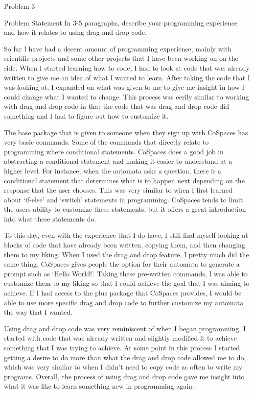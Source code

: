 \begin{problem}{Problem 3}
    \begin{statement}{Problem Statement}
        In 3-5 paragraphs, describe your programming experience and how it relates to using drag and drop code.
    \end{statement}

    \begin{Highlight}[Response]
        So far I have had a decent amount of programming experience, mainly with scientific projects and some other projects that I have been working on on the side. When I started learning how to code, I had to
        look at code that was already written to give me an idea of what I wanted to learn. After taking the code that I was looking at, I expanded on what was given to me to give me insight in how I could change
        what I wanted to change. This process was eerily similar to working with drag and drop code in that the code that was drag and drop code did something and I had to figure out how to customize it.

        The base package that is given to someone when they sign up with CoSpaces has very basic commands. Some of the commands that directly relate to programming where conditional statements. CoSpaces does a good
        job in abstracting a conditional statement and making it easier to understand at a higher level. For instance, when the automata asks a question, there is a conditional statement that determines what is to 
        happen next depending on the response that the user chooses. This was very similar to when I first learned about `if-else' and `switch' statements in programming. CoSpaces tends to limit the users ability to
        customize these statements, but it offers a great introduction into what these statements do.

        To this day, even with the experience that I do have, I still find myself looking at blocks of code that have already been written, copying them, and then changing them to my liking. When I used the drag and
        drop feature, I pretty much did the same thing. CoSpaces gives people the option for their automata to generate a prompt such as `Hello World!'. Taking these pre-written commands, I was able to customize them
        to my liking so that I could achieve the goal that I was aiming to achieve. If I had access to the plus package that CoSpaces provides, I would be able to use more specific drag and drop code to further customize
        my automata the way that I wanted.

        Using drag and drop code was very reminiscent of when I began programming. I started with code that was already written and slightly modified it to achieve something that I was trying to achieve. At some point
        in this process I started getting a desire to do more than what the drag and drop code allowed me to do, which was very similar to when I didn't need to copy code as often to write my programs. Overall, the process
        of using drag and drop code gave me insight into what it was like to learn something new in programming again.
    \end{Highlight}
\end{problem}

